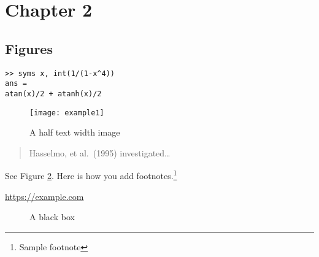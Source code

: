 \section{Chapter 2}

\subsection{Figures}

\lipsum[10]

\begin{verbatim}
>> syms x, int(1/(1-x^4))
ans =
atan(x)/2 + atanh(x)/2
\end{verbatim}

\lipsum[20]

\begin{figure}[ht]
    \centering
    \texttt{[image: example1]}
    \caption{A half text width image}
    \label{fig:halfwidthimage}
\end{figure}

\begin{quote}
  Hasselmo, et al.\ (1995) investigated\dots
\end{quote}

See Figure \ref{fig:blackbox}. Here is how you add footnotes.\footnote{Sample footnote}

\lipsum[2]

\begin{center}
  \url{https://example.com}
\end{center}

\begin{figure}[ht]
  \centering
  \fbox{\rule[-0.5cm]{4cm}{4cm} \rule[-0.5cm]{4cm}{0cm}}
  \caption{A black box}
  \label{fig:blackbox}
\end{figure}

\lipsum[9]

\lipsum[2]
